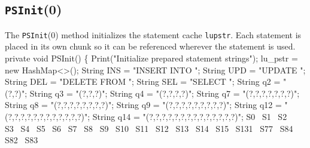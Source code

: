 \documentclass{article}
\theoremstyle{definition}                   %
\begin{document}
\subsection{{\tt{}\protect{}PSInit}(0)}
The {\tt{}\protect{}PSInit}(0) method initializes the statement cache {\tt{}\protect{}lu{}pstr}. Each
statement is placed in its own chunk so it can be referenced wherever the
statement is used.
\nwenddocs{}\endmoddef{}
private void PSInit() \{
  Print("Initialize prepared statement strings");
  lu_pstr = new HashMap<>();
  String INS = "INSERT INTO ";
  String UPD = "UPDATE ";
  String DEL = "DELETE FROM ";
  String SEL = "SELECT ";
  String q2  = "(?,?)";
  String q3  = "(?,?,?)";
  String q4  = "(?,?,?,?)";
  String q7  = "(?,?,?,?,?,?,?)";
  String q8  = "(?,?,?,?,?,?,?,?)";
  String q9  = "(?,?,?,?,?,?,?,?,?)";
  String q12 = "(?,?,?,?,?,?,?,?,?,?,?,?)";
  String q14 = "(?,?,?,?,?,?,?,?,?,?,?,?,?,?)";
  \LA{}S0~{\nwtagstyle{}}\RA{}
  \LA{}S1~{\nwtagstyle{}}\RA{}
  \LA{}S2~{\nwtagstyle{}}\RA{}
  \LA{}S3~{\nwtagstyle{}}\RA{}
  \LA{}S4~{\nwtagstyle{}}\RA{}
  \LA{}S5~{\nwtagstyle{}}\RA{}
  \LA{}S6~{\nwtagstyle{}}\RA{}
  \LA{}S7~{\nwtagstyle{}}\RA{}
  \LA{}S8~{\nwtagstyle{}}\RA{}
  \LA{}S9~{\nwtagstyle{}}\RA{}
  \LA{}S10~{\nwtagstyle{}}\RA{}
  \LA{}S11~{\nwtagstyle{}}\RA{}
  \LA{}S12~{\nwtagstyle{}}\RA{}
  \LA{}S13~{\nwtagstyle{}}\RA{}
  \LA{}S14~{\nwtagstyle{}}\RA{}
  \LA{}S15~{\nwtagstyle{}}\RA{}
  \LA{}S131~{\nwtagstyle{}}\RA{}
  \LA{}S77~{\nwtagstyle{}}\RA{}
  \LA{}S84~{\nwtagstyle{}}\RA{}
  \LA{}S82~{\nwtagstyle{}}\RA{}
  \LA{}S83~{\nwtagstyle{}}\RA{}
\end{document}
